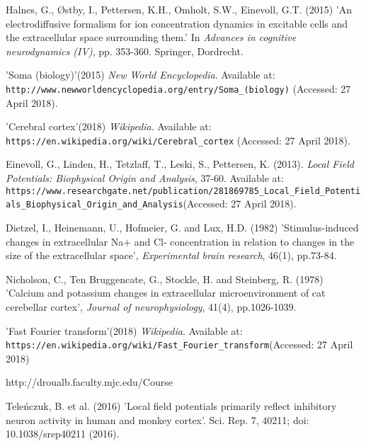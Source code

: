 \documentclass{article}
\begin{document}
\begin{thebibliography}{1}
Halnes, G., Østby, I., Pettersen, K.H., Omholt, S.W., Einevoll, G.T. (2015) 'An electrodiffusive formalism for ion concentration dynamics in excitable cells and the extracellular space surrounding them.' In \textit{Advances in cognitive neurodynamics (IV)}, pp. 353-360. Springer, Dordrecht.




'Soma (biology)'(2015) \textit{New World Encyclopedia}. Available at:
\\\texttt{http://www.newworldencyclopedia.org/entry/Soma\_(biology)} (Accessed: 27 April 2018).

'Cerebral cortex'(2018) \textit{Wikipedia}. Available at:
\\\texttt{https://en.wikipedia.org/wiki/Cerebral\_cortex} (Accessed: 27 April 2018).


Einevoll, G., Linden, H., Tetzlaff, T., Leski, S., Pettersen, K. (2013). \textit{Local Field Potentials: Biophysical Origin and Analysis}, 37-60. Available at:
\\\texttt{https://www.researchgate.net/publication/281869785\_Local\_Field\_Potentials\_Biophysical\_Origin\_and\_Analysis}(Accessed: 27 April 2018).



Dietzel, I., Heinemann, U., Hofmeier, G. and Lux, H.D. (1982) 'Stimulus-induced changes in extracellular Na+ and Cl- concentration in relation to changes in the size of the extracellular space', \textit{Experimental brain research}, 46(1), pp.73-84.


Nicholson, C., Ten Bruggencate, G., Stockle, H. and Steinberg, R. (1978) 'Calcium and potassium changes in extracellular microenvironment of cat cerebellar cortex', \textit{Journal of neurophysiology}, 41(4), pp.1026-1039.

'Fast Fourier transform'(2018) \textit{Wikipedia}. Available at:
\\\texttt{https://en.wikipedia.org/wiki/Fast\_Fourier\_transform}(Accessed: 27 April 2018)


http://droualb.faculty.mjc.edu/Course%

 Teleńczuk, B. et al. (2016) 'Local field potentials primarily reflect inhibitory neuron activity in human and monkey cortex'. Sci. Rep. 7, 40211; doi: 10.1038/srep40211 (2016).


\end{thebibliography}
\end{document}
